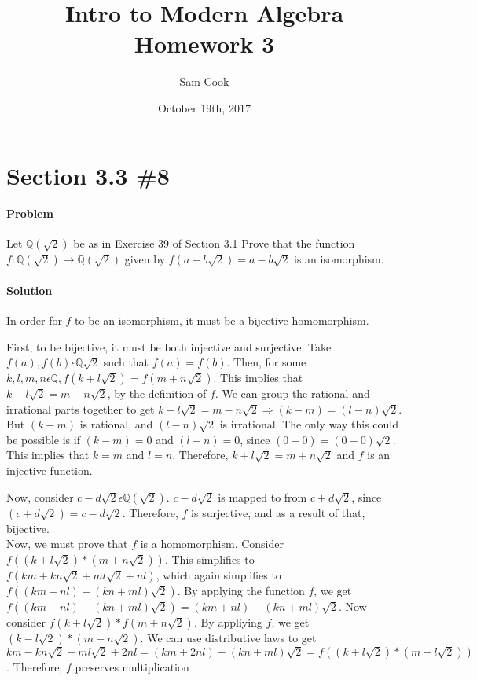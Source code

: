 \documentclass[a4paper,11pt]{article}
\author{Sam Cook}
\title{Intro to Modern Algebra \\Homework 3}
\date{October 19th, 2017}
\begin{document}
\maketitle
\section{Section 3.3 \#8}
\paragraph{Problem}
Let $\mathbb{Q}(\sqrt{2})$ be as in Exercise 39 of Section 3.1 Prove that the function $f:\mathbb{Q}(\sqrt{2})  \rightarrow \mathbb{Q}(\sqrt{2})$
given by $f(a + b\sqrt{2}) = a - b\sqrt{2}$ is an isomorphism.
\paragraph{Solution}

In order for $f$ to be an isomorphism, it must be a bijective homomorphism.

First, to be bijective, it must be both injective and surjective.
Take $f(a), f(b) \epsilon \mathbb{Q}\sqrt{2}$ such that $f(a) = f(b)$. Then, for some $k,l,m,n \epsilon \mathbb{Q}, f(k+l\sqrt{2}) = f(m + n\sqrt{2})$. This implies that $k-l\sqrt{2} = m - n\sqrt{2}$, by the definition of $f$. We can group the rational and irrational parts together to get $k-l\sqrt{2} = m - n\sqrt{2} \Rightarrow (k-m) = (l-n)\sqrt{2}$. But $(k-m)$ is rational, and $(l-n)\sqrt{2}$ is irrational. The only way this could be possible is if $(k-m)=0$ and $(l-n)=0$, since $(0-0) = (0-0)\sqrt{2}$. This implies that $k=m$ and $l=n$. Therefore, $k+l\sqrt{2} = m + n\sqrt{2}$ and $f$ is an injective function.

Now, consider $c - d\sqrt{2}  \epsilon \mathbb{Q}(\sqrt{2})$. $c - d\sqrt{2}$ is mapped to from $c + d\sqrt{2}$, since $(c + d\sqrt{2}) = c - d\sqrt{2}$. Therefore, $f$ is surjective, and as a result of that, bijective.\\

Now, we must prove that $f$ is a homomorphism.
Consider  $f((k+l\sqrt{2}) * (m + n\sqrt{2}))$. This simplifies to $f(km + kn\sqrt{2} + ml\sqrt{2} + nl)$, which again simplifies to $f((km + nl) + (kn + ml)\sqrt{2})$. By applying the function $f$, we get $f((km + nl) + (kn + ml)\sqrt{2}) = (km + nl) - (kn + ml)\sqrt{2}$. Now consider $f(k+l\sqrt{2}) * f(m+n\sqrt{2})$. By appliying $f$, we get $(k -l\sqrt{2}) * (m - n\sqrt{2})$. We  can use distributive laws to get $km - kn\sqrt{2} - ml\sqrt{2} +2nl = (km + 2nl) - (kn + ml)\sqrt{2} = f((k+l\sqrt{2}) * (m + l\sqrt{2}))$. Therefore, $f$ preserves multiplication
\end{document}
